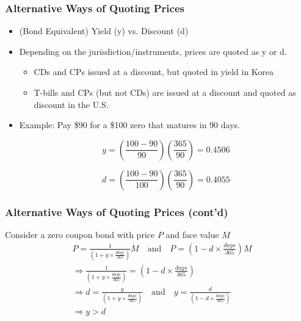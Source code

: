 \documentclass[10pt]{beamer}
\begin{document}
	\begin{frame}
		\frametitle{Alternative Ways of Quoting Prices}
		
		\begin{itemize}
			\item (Bond Equivalent) Yield (y) vs. Discount (d)
			
			\item Depending on the jurisdiction/instruments, prices are quoted as y or d.
			
			\begin{itemize}
				\item CDs and CPs issued at a discount, but quoted in yield in Korea
				\item T-bills and CPs (but not CDs) are issued at a discount and quoted as discount in the U.S.
			\end{itemize}		
			
			
			\item Example: Pay \$90 for a \$100 zero that matures in 90 days.
			
			$$
			y = \left( \frac{100-90}{90} \right) \left( \frac{365}{90}\right) = 0.4506
			$$
			
			$$
			d = \left( \frac{100-90}{100} \right) \left( \frac{365}{90}\right) = 0.4055
			$$
			
			
		\end{itemize}	
		
		
	\end{frame}
	
	
	
	
	\begin{frame}
		\frametitle{Alternative Ways of Quoting Prices (cont'd)}
		
		Consider a zero coupon bond with price $P$ and face value $M$ \vspace{10pt}
		\begin{align*}
			&P = \frac{1}{\left( 1+ y \times \frac{days}{365}\right)} M  \quad \text{and} \quad  P = \left( 1 - d \times \frac{days}{365} \right) M \\
			&\Rightarrow \frac{1}{\left( 1+ y \times \frac{days}{365}\right)} = \left( 1 - d \times \frac{days}{365} \right) \\
			&\Rightarrow d = \frac{y}{\left( 1+ y \times \frac{days}{365}\right)} \quad \text{and} \quad  y = \frac{d}{\left( 1 - d \times \frac{days}{365} \right)} \\
			&\Rightarrow y > d
		\end{align*}
		
	\end{frame}
	
\end{document}
